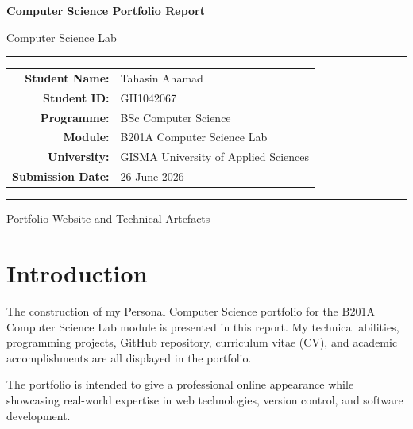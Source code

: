 \documentclass[12pt,a4paper]{article}
\begin{document}
\begin{titlepage}

\centering

\vspace*{1.5cm}

{\Huge\textbf{Computer Science Portfolio Report}}

\vspace{0.5cm}

{\Large Computer Science Lab}

\vspace{2cm}

\rule{0.8\textwidth}{1pt}

\vspace{1cm}

\renewcommand{\arraystretch}{1.8}
%
\begin{tabular}{rl}
\textbf{Student Name:} & Tahasin Ahamad \\
\textbf{Student ID:} & GH1042067 \\
\textbf{Programme:} & BSc Computer Science \\
\textbf{Module:} & B201A Computer Science Lab \\
\textbf{University:} & GISMA University of Applied Sciences \\
\textbf{Submission Date:} & 26 June 2026 \\
\end{tabular}

\vfill

\rule{0.8\textwidth}{1pt}

\vspace{0.5cm}

\Large Portfolio Website and Technical Artefacts

\end{titlepage}
%

\tableofcontents

\newpage

\section{Introduction}

The construction of my Personal Computer Science portfolio for the B201A Computer Science Lab module is presented in this report. My technical abilities, programming projects, GitHub repository, curriculum vitae (CV), and academic accomplishments are all displayed in the portfolio.

The portfolio is intended to give a professional online appearance while showcasing real-world expertise in web technologies, version control, and software development.
\end{document}
